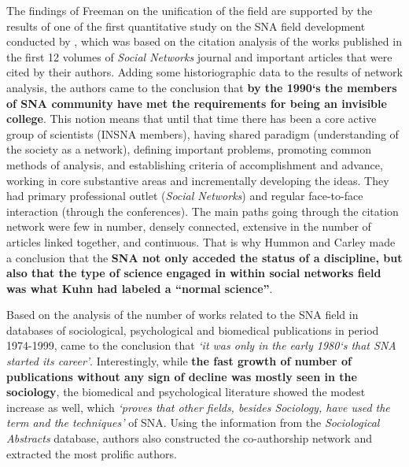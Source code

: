 \documentclass[11pt]{article} %
\begin{document}
The findings of Freeman on the unification of the field are supported by the results of one of the first quantitative study on the SNA field development conducted by \cite{normSci}, which was based on the citation analysis of the works published in the first 12 volumes of \textit{Social Networks} journal and important articles that were cited by their authors. Adding some historiographic data to the results of  network analysis, the authors came to the conclusion that \textbf{by the 1990`s the members of SNA community have met the requirements for being an invisible college}. This notion means that until that time there has been a core active group of scientists (INSNA members), having shared paradigm (understanding of the society as a network), defining important problems, promoting common methods of analysis, and establishing criteria of accomplishment and advance, working in core substantive areas and incrementally developing the ideas. They had primary professional outlet (\textit{Social Networks}) and regular face-to-face interaction (through the conferences). The main paths going through the citation network were few in number, densely connected, extensive in the number of articles linked together, and continuous. That is why Hummon and Carley made a conclusion that the \textbf{SNA not only acceded the status of a discipline, but also that the type of science engaged in within social networks field was what Kuhn had labeled a “normal science”}.\medskip 

Based on the analysis of the number of works related to the SNA field in databases of sociological, psychological and biomedical publications in period 1974-1999, \cite{SNAinf} came to the conclusion that \textit{`it was only in the early 1980`s that SNA started its career'}. Interestingly, while \textbf{the fast growth of number of publications without any sign of decline was mostly seen in the sociology}, the biomedical and psychological literature showed the modest increase as well, which \textit{`proves that other fields, besides Sociology, have used the term and the techniques'} of SNA. Using the information from the \textit{Sociological Abstracts} database, authors also constructed the co-authorship network and extracted the most prolific authors.\medskip 
\end{document}
